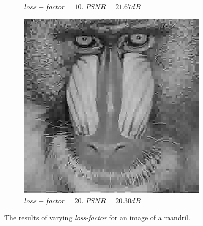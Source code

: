 \documentclass[11pt,a4paper]{article}
\begin{document}
\begin{figure}[ht]
\begin{subfigure}[h]{0.4\textwidth}
		\caption{$loss-factor = 10$. $PSNR = 21.67dB$}
		\label{mandril:10}
	\end{subfigure}
	\par\bigskip
	\begin{subfigure}[h]{0.4\textwidth}
		\includegraphics[width=\textwidth]{mandril_lf20}
		\caption{$loss-factor = 20$. $PSNR = 20.30dB$}
		\label{mandril:20}
	\end{subfigure}
	\caption{The results of varying \textit{loss-factor} for an image of a mandril.}
	\label{mandril:loss}
\end{figure}

\clearpage
\end{document}
